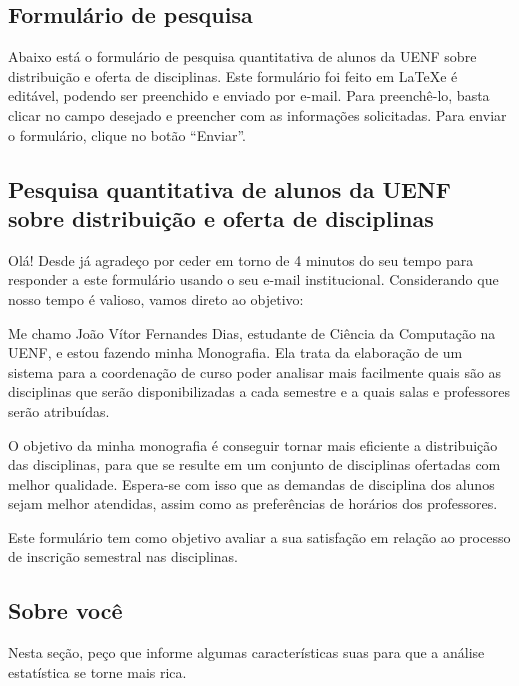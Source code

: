 \begin{apendicesenv}
  \chapter{Formulário de pesquisa} \label{apendice:FormularioPesquisaQuantitativaEditavel}

  Abaixo está o formulário de pesquisa quantitativa de alunos da UENF sobre distribuição e oferta de disciplinas. Este formulário foi feito em \LaTeX e é editável, podendo ser preenchido e enviado por e-mail. Para preenchê-lo, basta clicar no campo desejado e preencher com as informações solicitadas. Para enviar o formulário, clique no botão ``Enviar''.

  \begin{Form}[action=mailto:joaovitorfd2000@gmail.com, encoding=html, method=post]

    \section*{Pesquisa quantitativa de alunos da UENF sobre distribuição e oferta de disciplinas}

    Olá! Desde já agradeço por ceder em torno de 4 minutos do seu tempo para responder a este formulário usando o seu e-mail institucional. Considerando que nosso tempo é valioso, vamos direto ao objetivo:

    Me chamo João Vítor Fernandes Dias, estudante de Ciência da Computação na UENF, e estou fazendo minha Monografia. Ela trata da elaboração de um sistema para a coordenação de curso poder analisar mais facilmente quais são as disciplinas que serão disponibilizadas a cada semestre e a quais salas e professores serão atribuídas.

    O objetivo da minha monografia é conseguir tornar mais eficiente a distribuição das disciplinas, para que se resulte em um conjunto de disciplinas ofertadas com melhor qualidade. Espera-se com isso que as demandas de disciplina dos alunos sejam melhor atendidas, assim como as preferências de horários dos professores.

    Este formulário tem como objetivo avaliar a sua satisfação em relação ao processo de inscrição semestral nas disciplinas.

    \section*{Sobre você}

    Nesta seção, peço que informe algumas características suas para que a análise estatística se torne mais rica.


\end{Form}
\end{apendicesenv}
